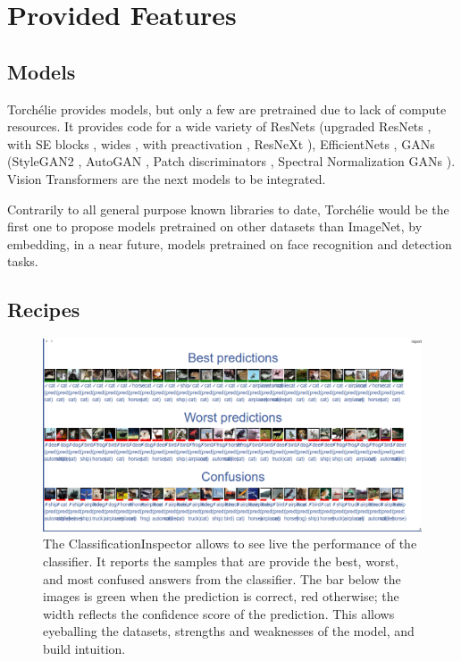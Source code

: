 \section{Provided Features}

\subsection{Models}


Torchélie provides models, but only a few are pretrained due to lack of compute resources. It provides code for a wide variety of ResNets \cite{resnet} (upgraded ResNets \cite{resnettricks}, with SE blocks \cite{squeezeexcitation}, wides \cite{wrn}, with preactivation \cite{preact}, ResNeXt \cite{resnext}), EfficientNets \cite{efficientnet}, GANs (StyleGAN2 \cite{stylegan2}, AutoGAN \cite{autogan}, Patch discriminators \cite{pix2pix}, Spectral Normalization GANs \cite{SNGAN}). Vision Transformers are the next models to be integrated.

Contrarily to all general purpose known libraries to date, Torchélie would be the first one to propose models pretrained on other datasets than ImageNet, by embedding, in a near future, models pretrained on face recognition and detection tasks.

\subsection{Recipes}

\begin{figure}[h]
    \centering
    \includegraphics[width=\columnwidth]{90-files/classifreport.png}
    \caption{The ClassificationInspector allows to see live the performance of the classifier. It reports the samples that are provide the best, worst, and most confused answers from the classifier. The bar below the images is green when the prediction is correct, red otherwise; the width reflects the confidence score of the prediction. This allows eyeballing the datasets, strengths and weaknesses of the model, and build intuition.}
    \label{fig:classifreport}
\end{figure}

